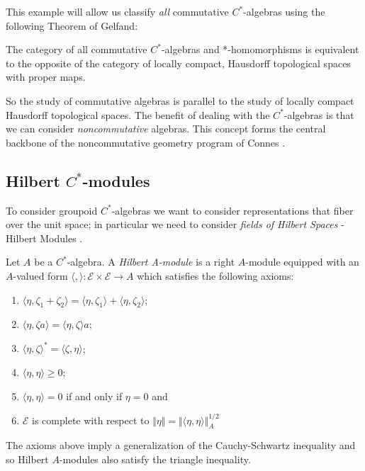 This example will allow us classify \textit{all} commutative $C^{*}$-algebras using the following Theorem of Gelfand:

\begin{theorem}
The category of all commutative $C^{*}$-algebras and *-homomorphisms is equivalent to the opposite of the category of locally compact, Hausdorff topological spaces with proper maps.
\end{theorem}

So the study of commutative algebras is parallel to the study of locally compact Hausdorff topological spaces. The benefit of dealing with the $C^{*}$-algebras is that we can consider \textit{noncommutative} algebras. This concept forms the central backbone of the noncommutative geometry program of Connes \cite{MR1826266}.

\subsection{Hilbert $C^{*}$-modules}
To consider groupoid $C^{*}$-algebras we want to consider representations that fiber over the unit space; in particular we need to consider \textit{fields of Hilbert Spaces} - Hilbert Modules \cite{MR1325694}.

\begin{definition}
Let $A$ be a $C^{*}$-algebra. A \textit{Hilbert A-module}  is a right $A$-module equipped with an $A$-valued form $\langle , \rangle: \mathscr{E} \times \mathscr{E} \rightarrow A$ which satisfies the following axioms:
\begin{enumerate}
\item $\langle \eta ,\zeta_{1} + \zeta_{2} \rangle = \langle \eta , \zeta_{1}\rangle + \langle \eta ,\zeta_{2} \rangle$;
\item $\langle \eta , \zeta a \rangle = \langle \eta ,\zeta \rangle a$;
\item $\langle \eta , \zeta \rangle^{*} = \langle \zeta ,\eta \rangle$;
\item $\langle \eta, \eta \rangle \geq 0$;
\item $\langle \eta ,\eta  \rangle = 0 $ if and only if $ \eta = 0$ and
\item $\mathscr{E}$ is complete with respect to $\Vert \eta \Vert = \Vert \langle \eta , \eta \rangle \Vert_{A}^{1/2}$
\end{enumerate}
\end{definition}

\begin{remark}
The axioms above imply a generalization of the Cauchy-Schwartz inequality and so Hilbert $A$-modules also satisfy the triangle inequality.
\end{remark}

